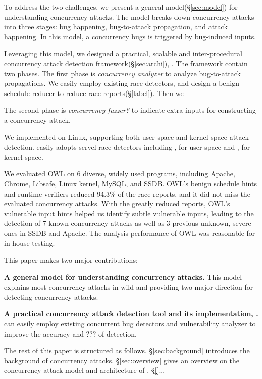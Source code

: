 To address the two challenges, we present a general model(\S\ref{sec:model}) 
for understanding concurrency attacks.
The model breaks down concurrency attacks into three stages: bug happening, 
bug-to-attack propagation, and attack happening. In this model, 
a concurrency bugs is triggered by bug-induced inputs. 



Leveraging this model, we designed a practical, scalable and inter-procedural concurrency 
attack detection framework(\S\ref{sec:archi}), \xxx. 
The framework contain two phases.
The first phase is \emph{concurrency analyzer} to analyze bug-to-attack propagations. 
We easily employ existing race detectors, and design a benign schedule reducer to reduce race reports(\S\ref{label}). 
Then we 

The second phase is \emph{concurrency fuzzer?} to indicate extra inputs for constructing a concurrency attack. 


We implemented \xxx on Linux, supporting both user space and kernel space attack detection. 
\xxx easily adopts servel race detectors including \tsan, \valgrind for user space and 
\ktsan, \ski for kernel space. 



We evaluated OWL on 6 diverse, widely used programs, including Apache, Chrome, Libsafe, Linux kernel, MySQL,
and SSDB. OWL’s benign schedule hints and runtime verifiers reduced 94.3\% of the race reports, 
and it did not miss the evaluated concurrency attacks. With the greatly reduced reports,
OWL’s vulnerable input hints helped us identify subtle
vulnerable inputs, leading to the detection of 7 known concurrency
attacks as well as 3 previous unknown, severe ones
in SSDB and Apache. The analysis performance of OWL was
reasonable for in-house testing.


This paper makes two major contributions:

\begin{tightenum}
\item \textbf{A general model for understanding concurrency attacks.} 
This model explains most concurrency attacks in wild and 
providing two major direction for detecting concurrency attacks. 
	
\item \textbf{A practical concurrency attack detection tool and its implementation, \xxx.} 
\xxx can easily employ existing concurrent bug detectors and vulnerability analyzer 
to improve the accuracy and ??? of detection.
	
\end{tightenum}

 

The rest of this paper is structured as follows. 
\S\ref{sec:background} introduces the background of concurrency attacks.
\S\ref{sec:overview} gives an overview on the concurrency attack model and architecture of \xxx.
\S\ref{}...





